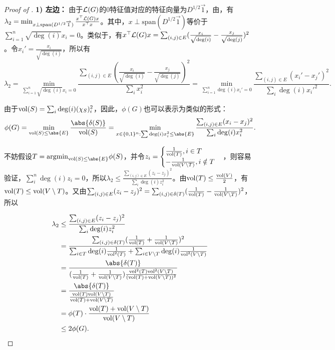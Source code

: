 \begin{proof}[Proof of ]
\textbf{1) 左边：}
由于$\mathcal{L}(G)$的$0$特征值对应的特征向量为$D^{1/2}\overrightarrow{1}$，由，有$\lambda_2=\min_{x\perp\mathrm{span}(D^{1/2}\overrightarrow{1})}\frac{x^{\top}\mathcal{L}(G) x}{x^{\top}x}$。其中，$x\perp\mathrm{span}(D^{1/2}\overrightarrow{1})$等价于$\sum_{i=1}^n\sqrt{\deg(i)}x_i=0$。类似于，有${x}^{\top}{\mathcal{L}(G)}{x}=\sum_{(i,j)\in E}(\frac{x_i}{\sqrt{\deg(i)}}-\frac{x_j}{\sqrt{\deg(j)}})^2$。令$x_i'=\frac{x_i}{\sqrt{\deg(i)}}$，所以有\[\lambda_2=\min_{\sum_{i=1}^n\sqrt{\deg(i)}x_i=0}\frac{\sum_{(i,j)\in E}(\frac{x_i}{\sqrt{\deg(i)}}-\frac{x_j}{\sqrt{\deg(j)}})^2}{\sum_{i}x_i^2}=\min_{\sum_{i=1}^n\deg(i)x_i'=0}\frac{\sum_{(i,j)\in E}(x_i'-x_j')^2}{\sum_{i}\deg(i)x_i'^2}.\]

由于$\mathrm{vol}(S)=\sum_{i}\deg(i)(\chi_S)_i^2$，因此，$\phi(G)$也可以表示为类似的形式：\[\phi(G)=\min_{\vol(S)\leq\abs{E}}\frac{\abs{\delta(S)}}{\vol(S)}=\min_{x\in\{0,1\}^n:\sum\deg(i)x_i^2\leq\abs{E}}\frac{\sum_{(i,j)\in E}(x_i-x_j)^2}{\sum_i{\deg(i)x_i^2}}.\]

不妨假设$T=\argmin_{\vol(S)\leq\abs{E}}\phi(S)$，并令$z_i=\begin{cases}
    \frac{1}{\mathrm{vol}(T)}, i\in T\\
    -\frac{1}{\mathrm{vol}(V\setminus T)}, i\notin T
\end{cases}$，则容易验证，$\sum_i^n\deg(i)z_i=0$，所以$\lambda_2\leq\frac{\sum_{(i,j)\in E}(z_i-z_j)^2}{\sum_{i}\deg(i)z_i^2}$。由$\mathrm{vol}(T)\leq\frac{\mathrm{vol}(V)}{2}$，有$\mathrm{vol}(T)\leq\mathrm{vol}(V\setminus T)$。又由$\sum_{(i,j)\in E}(z_i-z_j)^2=\sum_{(i,j)\in\delta(T)}(\frac{1}{\mathrm{vol}(T)}-\frac{1}{\mathrm{vol}(V\setminus T)})^2$，所以

\begin{align*}
    \lambda_2
    &\leq\frac{\sum_{(i,j)\in E}(z_i-z_j)^2}{\sum_{i}\deg(i)z_i^2}\\
    &=\frac{\sum_{(i,j)\in\delta(T)}(\frac{1}{\vol(T)}+\frac{1}{\vol(V\setminus T)})^2}{\sum_{i\in T}\deg(i)\frac{1}{\vol^2(T)}+\sum_{i\in V\setminus T}\deg(i)\frac{1}{\vol^2(V\setminus T)}}\\
    &=\frac{\abs{\delta(T)}}{(\frac{1}{\vol(T)}+\frac{1}{\vol(V\setminus T)})\frac{\vol^2(T)\vol^2(V\setminus T)}{(\vol(T)+\vol(V\setminus T))^2}}\\
    &=\frac{\abs{\delta(T)}}{\frac{\vol(T)\vol(V\setminus T)}{\vol(T)+\vol(V\setminus T)}}\\
    &=\phi(T)\cdot\frac{\vol(T)+\vol(V\setminus T)}{\vol(V\setminus T)}\\
    &\leq2\phi(G).
\end{align*}


\end{proof}
